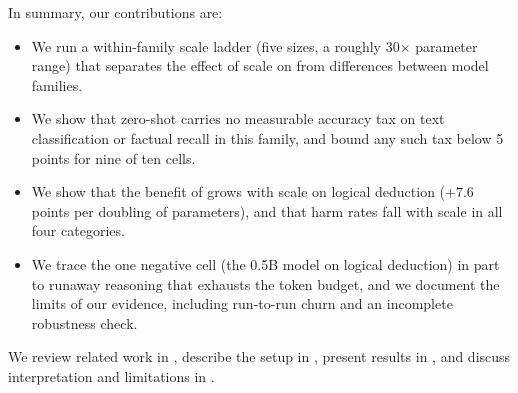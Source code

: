 In summary, our contributions are:
\begin{itemize}[leftmargin=*,itemsep=0pt,topsep=0pt]
    \item We run a within-family scale ladder (five sizes, a roughly 30$\times$ parameter range) that separates the effect of scale on \CoT from differences between model families.
    \item We show that zero-shot \CoT carries no measurable accuracy tax on text classification or factual recall in this family, and bound any such tax below 5 points for nine of ten cells.
    \item We show that the benefit of \CoT grows with scale on logical deduction ($+7.6$ points per doubling of parameters), and that harm rates fall with scale in all four categories.
    \item We trace the one negative cell (the 0.5B model on logical deduction) in part to runaway reasoning that exhausts the token budget, and we document the limits of our evidence, including run-to-run churn and an incomplete robustness check.
\end{itemize}

We review related work in , describe the setup in , present results in , and discuss interpretation and limitations in .
